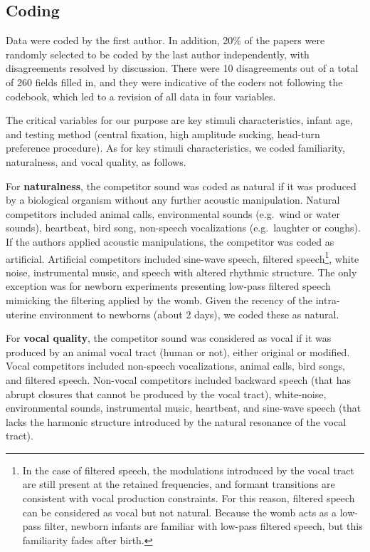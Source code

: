 \documentclass[
  english,
  man]{apa6}
\begin{document}
\hypertarget{coding}{%
\subsection{Coding}\label{coding}}

Data were coded by the first author. In addition, 20\% of the papers were randomly selected to be coded by the last author independently, with disagreements resolved by discussion. There were 10 disagreements out of a total of 260 fields filled in, and they were indicative of the coders not following the codebook, which led to a revision of all data in four variables.

The critical variables for our purpose are key stimuli characteristics, infant age, and testing method (central fixation, high amplitude sucking, head-turn preference procedure). As for key stimuli characteristics, we coded familiarity, naturalness, and vocal quality, as follows.

For \textbf{naturalness}, the competitor sound was coded as natural if it was produced by a biological organism without any further acoustic manipulation. Natural competitors included animal calls, environmental sounds (e.g.~wind or water sounds), heartbeat, bird song, non-speech vocalizations (e.g.~laughter or coughs). If the authors applied acoustic manipulations, the competitor was coded as artificial. Artificial competitors included sine-wave speech, filtered speech\footnote{In the case of filtered speech, the modulations introduced by the vocal tract are still present at the retained frequencies, and formant transitions are consistent with vocal production constraints. For this reason, filtered speech can be considered as vocal but not natural. Because the womb acts as a low-pass filter, newborn infants are familiar with low-pass filtered speech, but this familiarity fades after birth.}, white noise, instrumental music, and speech with altered rhythmic structure. The only exception was for newborn experiments presenting low-pass filtered speech mimicking the filtering applied by the womb. Given the recency of the intra-uterine environment to newborns (about 2 days), we coded these as natural.

For \textbf{vocal quality}, the competitor sound was considered as vocal if it was produced by an animal vocal tract (human or not), either original or modified. Vocal competitors included non-speech vocalizations, animal calls, bird songs, and filtered speech. Non-vocal competitors included backward speech (that has abrupt closures that cannot be produced by the vocal tract), white-noise, environmental sounds, instrumental music, heartbeat, and sine-wave speech (that lacks the harmonic structure introduced by the natural resonance of the vocal tract).
\end{document}
